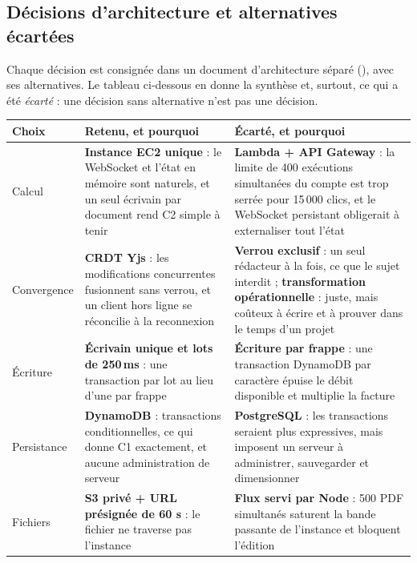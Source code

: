 \subsection{Décisions d'architecture et alternatives écartées}

Chaque décision est consignée dans un document d'architecture séparé
(), avec ses alternatives. Le tableau ci-dessous en donne la
synthèse et, surtout, ce qui a été \emph{écarté} : une décision sans alternative
n'est pas une décision.

\begin{table}[H]
\centering
\small
\begin{tabular}{@{}p{3.0cm}p{6.2cm}p{6.3cm}@{}}
\toprule
\textbf{Choix} & \textbf{Retenu, et pourquoi} & \textbf{Écarté, et pourquoi} \\
\midrule
Calcul
& \textbf{Instance EC2 unique} : le WebSocket et l'état en mémoire sont
  naturels, et un seul écrivain par document rend C2 simple à tenir
& \textbf{Lambda + API Gateway} : la limite de 400 exécutions simultanées du
  compte est trop serrée pour 15\,000 clics, et le WebSocket persistant
  obligerait à externaliser tout l'état \\
\addlinespace
Convergence
& \textbf{CRDT Yjs} : les modifications concurrentes fusionnent sans verrou, et
  un client hors ligne se réconcilie à la reconnexion
& \textbf{Verrou exclusif} : un seul rédacteur à la fois, ce que le sujet
  interdit ; \textbf{transformation opérationnelle} : juste, mais coûteux à
  écrire et à prouver dans le temps d'un projet \\
\addlinespace
Écriture
& \textbf{Écrivain unique et lots de 250\,ms} : une transaction par lot au lieu
  d'une par frappe
& \textbf{Écriture par frappe} : une transaction DynamoDB par caractère épuise
  le débit disponible et multiplie la facture \\
\addlinespace
Persistance
& \textbf{DynamoDB} : transactions conditionnelles, ce qui donne C1 exactement,
  et aucune administration de serveur
& \textbf{PostgreSQL} : les transactions seraient plus expressives, mais
  imposent un serveur à administrer, sauvegarder et dimensionner \\
\addlinespace
Fichiers
& \textbf{S3 privé + URL présignée de 60 s} : le fichier ne traverse pas
  l'instance
& \textbf{Flux servi par Node} : 500 PDF simultanés saturent la bande passante
  de l'instance et bloquent l'édition \\

\end{tabular}
\end{table}
